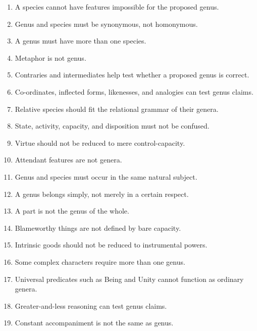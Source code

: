 \documentclass[12pt]{article}
\begin{document}
\begin{enumerate}[itemsep=0.5em]
    \item A species cannot have features impossible for the proposed genus.

    \item Genus and species must be synonymous, not homonymous.

    \item A genus must have more than one species.

    \item Metaphor is not genus.

    \item Contraries and intermediates help test whether a proposed genus is
    correct.

    \item Co-ordinates, inflected forms, likenesses, and analogies can test genus
    claims.

    \item Relative species should fit the relational grammar of their genera.

    \item State, activity, capacity, and disposition must not be confused.

    \item Virtue should not be reduced to mere control-capacity.

    \item Attendant features are not genera.

    \item Genus and species must occur in the same natural subject.

    \item A genus belongs simply, not merely in a certain respect.

    \item A part is not the genus of the whole.

    \item Blameworthy things are not defined by bare capacity.

    \item Intrinsic goods should not be reduced to instrumental powers.

    \item Some complex characters require more than one genus.

    \item Universal predicates such as Being and Unity cannot function as
    ordinary genera.

    \item Greater-and-less reasoning can test genus claims.

    \item Constant accompaniment is not the same as genus.
\end{enumerate}
\end{document}
